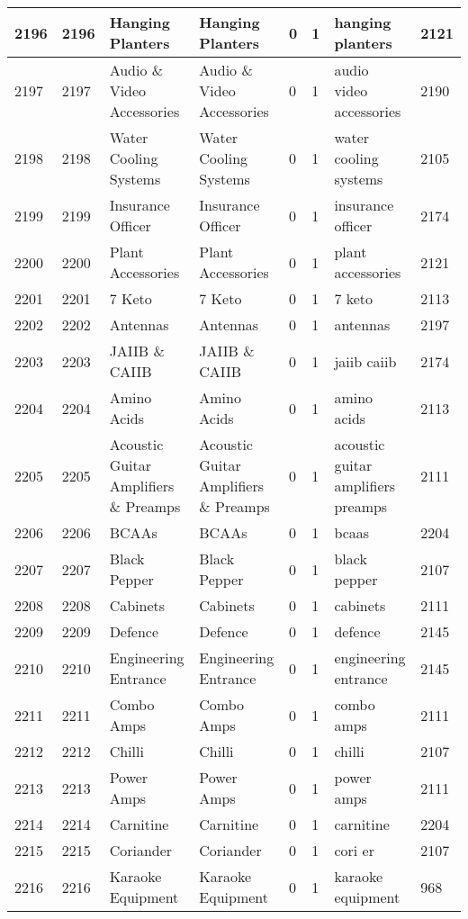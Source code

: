 \begin{longtable}{|l|l|l|l|l|l|l|l|}
2196 & 2196 & Hanging Planters & Hanging Planters & 0 & 1 & hanging planters & 2121 \\ \hline 
2197 & 2197 & Audio \& Video Accessories & Audio \& Video Accessories & 0 & 1 & audio video accessories & 2190 \\ \hline 
2198 & 2198 & Water Cooling Systems & Water Cooling Systems & 0 & 1 & water cooling systems & 2105 \\ \hline 
2199 & 2199 & Insurance Officer & Insurance Officer & 0 & 1 & insurance officer & 2174 \\ \hline 
2200 & 2200 & Plant Accessories & Plant Accessories & 0 & 1 & plant accessories & 2121 \\ \hline 
2201 & 2201 & 7 Keto & 7 Keto & 0 & 1 & 7 keto & 2113 \\ \hline 
2202 & 2202 & Antennas & Antennas & 0 & 1 & antennas & 2197 \\ \hline 
2203 & 2203 & JAIIB \& CAIIB & JAIIB \& CAIIB & 0 & 1 & jaiib caiib & 2174 \\ \hline 
2204 & 2204 & Amino Acids & Amino Acids & 0 & 1 & amino acids & 2113 \\ \hline 
2205 & 2205 & Acoustic Guitar Amplifiers \& Preamps & Acoustic Guitar Amplifiers \& Preamps & 0 & 1 & acoustic guitar amplifiers preamps & 2111 \\ \hline 
2206 & 2206 & BCAAs & BCAAs & 0 & 1 & bcaas & 2204 \\ \hline 
2207 & 2207 & Black Pepper & Black Pepper & 0 & 1 & black pepper & 2107 \\ \hline 
2208 & 2208 & Cabinets & Cabinets & 0 & 1 & cabinets & 2111 \\ \hline 
2209 & 2209 & Defence & Defence & 0 & 1 & defence & 2145 \\ \hline 
2210 & 2210 & Engineering Entrance & Engineering Entrance & 0 & 1 & engineering entrance & 2145 \\ \hline 
2211 & 2211 & Combo Amps & Combo Amps & 0 & 1 & combo amps & 2111 \\ \hline 
2212 & 2212 & Chilli & Chilli & 0 & 1 & chilli & 2107 \\ \hline 
2213 & 2213 & Power Amps & Power Amps & 0 & 1 & power amps & 2111 \\ \hline 
2214 & 2214 & Carnitine & Carnitine & 0 & 1 & carnitine & 2204 \\ \hline 
2215 & 2215 & Coriander & Coriander & 0 & 1 & cori er & 2107 \\ \hline 
2216 & 2216 & Karaoke Equipment & Karaoke Equipment & 0 & 1 & karaoke equipment & 968 \\ \hline 

\end{longtable}

